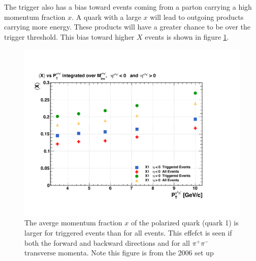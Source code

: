\documentclass[abstract = on,listof=totoc, bibliography=totoc]{scrreprt}
\newcommand{\pip}{\pi^+}
\newcommand{\pim}{\pi^-}
\newcommand{\pair}{$\pip\pim$ }
\begin{document}

The trigger also has a bias toward events coming from a parton carrying a high momentum fraction $x$. A quark with a large $x$ will lead to outgoing products carrying more energy. These products will have a greater chance to be over the trigger threshold. This bias toward higher $X$ events is shown in figure \ref{fig:TriggerBiasXHiQualColor}. 

\begin{figure}
\begin{center}
\includegraphics[width = 1\textwidth]{TriggerBiasXHiQualColor}
\caption[Trigger bias toward higher momentum fraction $x$ events]{The averge momentum fraction $x$ of the polarized quark (quark 1) is larger for triggered events than for all events. This effefct is seen if both the forward and backward directions and for all \pair transverse momenta. Note this figure is from the 2006 set up}
\label{fig:TriggerBiasXHiQualColor}
\end{center}
\end{figure}
\end{document}
